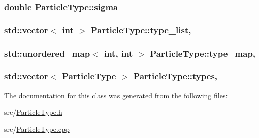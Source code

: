 \subsubsection[{\texorpdfstring{sigma}{sigma}}]{\setlength{\rightskip}{0pt plus 5cm}double Particle\+Type\+::sigma\hspace{0.3cm}{\ttfamily [private]}}\hypertarget{classParticleType_a25ee646610c406b46d8eb12b40c22702}{}\label{classParticleType_a25ee646610c406b46d8eb12b40c22702}
\subsubsection[{\texorpdfstring{type\+\_\+list}{type_list}}]{\setlength{\rightskip}{0pt plus 5cm}std\+::vector$<$ int $>$ Particle\+Type\+::type\+\_\+list\hspace{0.3cm}{\ttfamily [static]}, {\ttfamily [private]}}\hypertarget{classParticleType_a6f874a186f9da4da7ca9f9aac65b355a}{}\label{classParticleType_a6f874a186f9da4da7ca9f9aac65b355a}
\subsubsection[{\texorpdfstring{type\+\_\+map}{type_map}}]{\setlength{\rightskip}{0pt plus 5cm}std\+::unordered\+\_\+map$<$ int, int $>$ Particle\+Type\+::type\+\_\+map\hspace{0.3cm}{\ttfamily [static]}, {\ttfamily [private]}}\hypertarget{classParticleType_a86aad107a375f2c8fd89829b7cc1f169}{}\label{classParticleType_a86aad107a375f2c8fd89829b7cc1f169}
\subsubsection[{\texorpdfstring{types}{types}}]{\setlength{\rightskip}{0pt plus 5cm}std\+::vector$<$ {\bf Particle\+Type} $>$ Particle\+Type\+::types\hspace{0.3cm}{\ttfamily [static]}, {\ttfamily [private]}}\hypertarget{classParticleType_a6a8be2f8b725af22c139c4066561b659}{}\label{classParticleType_a6a8be2f8b725af22c139c4066561b659}


The documentation for this class was generated from the following files\+:\begin{DoxyCompactItemize}
\item 
src/\hyperlink{ParticleType_8h}{Particle\+Type.\+h}\item 
src/\hyperlink{ParticleType_8cpp}{Particle\+Type.\+cpp}\end{DoxyCompactItemize}
